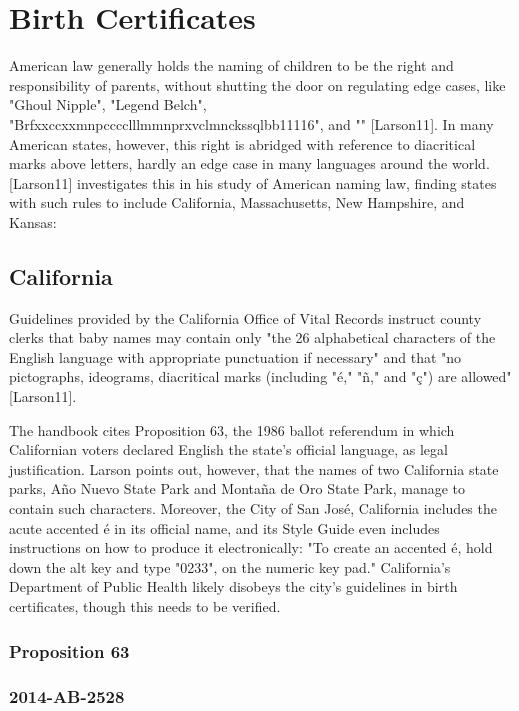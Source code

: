 \section{Birth Certificates}

American law generally holds the naming of children to be the right and
responsibility of parents, without shutting the door on regulating edge cases,
like "Ghoul Nipple", "Legend Belch",
"Brfxxccxxmnpcccclllmmnprxvclmnckssqlbb11116", and "" {[}Larson11{]}. In many
American states, however, this right is abridged with reference to diacritical
marks above letters, hardly an edge case in many languages around the world.
{[}Larson11{]} investigates this in his study of American naming law, finding
states with such rules to include California, Massachusetts, New Hampshire, and
Kansas:

\subsection{California}

Guidelines provided by the California Office of Vital Records instruct
county clerks that baby names may contain only "the 26 alphabetical
characters of the English language with appropriate punctuation if
necessary" and that "no pictographs, ideograms, diacritical marks
(including "é," "ñ," and "ç") are allowed" {[}Larson11{]}.

The handbook cites Proposition 63, the 1986 ballot referendum in which
Californian voters declared English the state's official language, as
legal justification. Larson points out, however, that the names of two
California state parks, Año Nuevo State Park and Montaña de Oro State
Park, manage to contain such characters. Moreover, the City of San José,
California includes the acute accented é in its official name, and its
Style Guide even includes instructions on how to produce it
electronically: "To create an accented é, hold down the alt key and
type "0233"‚ on the numeric key pad." California's Department of
Public Health likely disobeys the city's guidelines in birth
certificates, though this needs to be verified.

\subsubsection{Proposition 63}

\subsubsection{2014-AB-2528}

